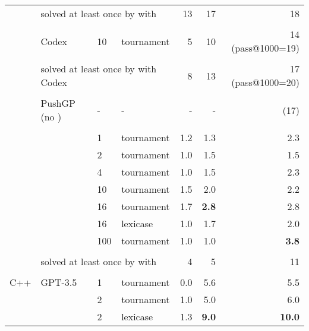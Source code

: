 \begin{table}[t]
\begin{adjustbox}{max width=.92\textwidth}
\begin{DIFnomarkup}
\begin{tabular}{llllrrr}
    &  \multicolumn{3}{l}{solved at least once by \method{} with \gpt{}} &  13 &       17 &       18 \\[1pt]
\cline{2-7}\\[-8pt]
        & Codex  & 10 & tournament &      5 &       10 &        14 (pass@1000=19) \\[1pt]
\cline{3-7}\\[-8pt]
       &  \multicolumn{3}{l}{solved at least once by \method{} with Codex}   & 8 &       13 &        17 (pass@1000=20) \\[3pt]
\cline{2-7}\\[-8pt]
        &  PushGP (no \method{})   &    -            &       - &        - &       - &  (17)\\[1pt]
\cline{2-7}\\[-8pt]
% 
        & \llama{} & 1   &         tournament &     1.2 &      1.3 &       2.3 \\
        &        & 2   &         tournament &     1.0 &      1.5 &       1.5 \\
        &        & 4   &         tournament &     1.0 &      1.5 &       2.3 \\
        &        & 10  &         tournament &     1.5 &      2.0 &       2.2 \\
        &        & 16  &         tournament &     1.7 &      \textbf{2.8} &       2.8 \\
        &        & 16  &           lexicase &     1.0 &      1.7 &       2.0 \\
        &        & 100 &         tournament &     1.0 &      1.0 &       \textbf{3.8} \\[1pt]
\cline{3-7}\\[-8pt]
    &  \multicolumn{3}{l}{solved at least once by \method{} with \llama{}} &   4 &        5 &       11 \\
\midrule\\[-8pt]
 C++ & GPT-3.5 & 1   &         tournament &     0.0 &      5.6 &       5.5 \\
       &        & 2   &         tournament &     1.0 &      5.0 &       6.0 \\
       &        & 2   &           lexicase &     1.3 &     \textbf{ 9.0} &      \textbf{10.0} \\

\end{tabular}
\end{DIFnomarkup}
\end{adjustbox}
\end{table}
